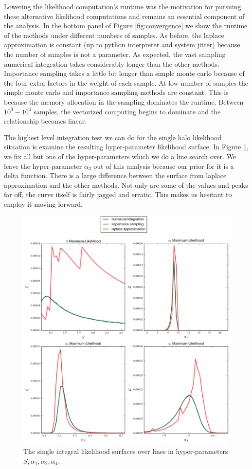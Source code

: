\documentclass[\docopts]{\docclass}
\begin{document}
Lowering the likelihood computation's runtime was the motivation for pursuing these alternative likelihood computations and remains an essential component of the analysis.
In the bottom panel of Figure \ref{fig:convergence} we show the runtime of the methods under different numbers of samples.
As before, the laplace approximation is constant (up to python interpreter and system jitter) because the number of samples is not a parameter.
As expected, the vast sampling numerical integration takes considerably longer than the other methods.
Importance sampling takes a little bit longer than simple monte carlo because of the four extra factors in the weight of each sample. 
At low number of samples the simple monte carlo and importance sampling methods are constant.
This is because the memory allocation in the sampling dominates the runtime.
Between $10^3-10^4$ samples, the vectorized computing begins to dominate and the relationship becomes linear. 

The highest level integration test we can do for the single halo likelihood situation is examine the resulting hyper-parameter likelihood surface. In Figure \ref{fig:posterior_all}, we fix all but one of the hyper-parameters which we do a line search over. 
We leave the hyper-parameter $\alpha_3$ out of this analysis because our prior for it is a delta function.
There is a large difference between the surface from laplace approximation and the other methods. Not only are some of the values and peaks far off, the curve itself is fairly jagged and erratic.
This makes us hesitant to employ it moving forward.

\begin{figure}[!h]
\centering
\includegraphics[width=0.9\columnwidth]{posterior_all.png}
\caption{
The single integral likelihood surfaces over lines in hyper-parameters $S, \alpha_1, \alpha_2, \alpha_4$. 
\label{fig:posterior_all}}
\end{figure}
\end{document}
